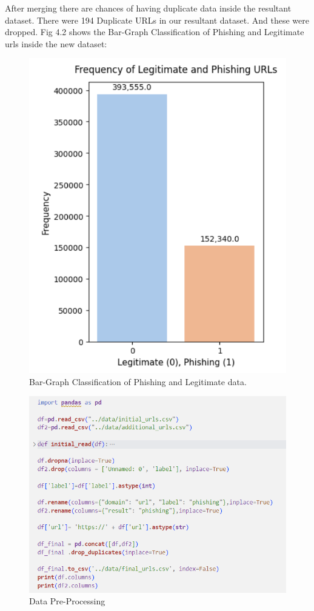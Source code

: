 \par After merging there are chances of having duplicate data inside the resultant dataset. There were 194 Duplicate URLs in our resultant dataset. And these were dropped. Fig 4.2 shows the 
Bar-Graph Classification of Phishing and Legitimate urls inside the new dataset:

\begin{figure}[H] 
  \centering
  \includegraphics[scale=0.6]{barGraph_PorL.png} 
  \caption{Bar-Graph Classification of Phishing and Legitimate data.}
  \label{fig}
\end{figure}

\begin{figure}[H] 
  \centering
  \includegraphics[scale=0.68]{DataPreprocessing_Code.png} 
  \caption{Data Pre-Processing}
  \label{fig}
\end{figure}

